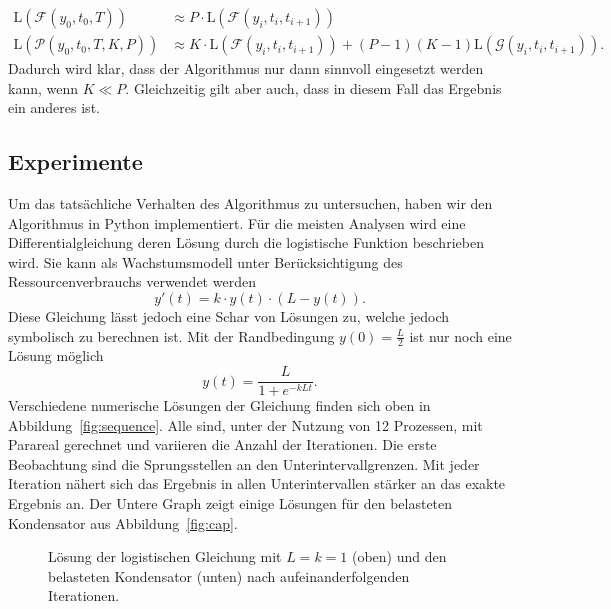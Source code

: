 \begin{align*}
    \mathrm{L}\!\left(\mathcal{F}\!\!\left(y_0, t_0, T\right)\right)
    &\approx P \cdot \mathrm{L}\!\left(\mathcal{F}\!\!\left(y_i, t_i, t_{i+1}\right)\right)\\
    \mathrm{L}\!\left(\mathcal{P}\!\!\left(y_0, t_0, T, K, P\right)\right)
    &\approx K \cdot \mathrm{L}\!\left(\mathcal{F}\!\!\left(y_i, t_i, t_{i+1}\right)\right) + (P-1) (K-1) \mathrm{L}\!\left(\mathcal{G}\!\!\left(y_i, t_i, t_{i+1}\right)\right).
\end{align*}
Dadurch wird klar, dass der Algorithmus nur dann sinnvoll eingesetzt werden kann, wenn \(K \ll P\). Gleichzeitig gilt aber auch, dass in diesem Fall das Ergebnis ein anderes ist.
\subsection*{Experimente}
Um das tatsächliche Verhalten des Algorithmus zu untersuchen, haben wir den Algorithmus in Python implementiert. Für die meisten Analysen wird eine Differentialgleichung deren Lösung durch die logistische Funktion beschrieben wird. Sie kann als Wachstumsmodell unter Berücksichtigung des Ressourcenverbrauchs verwendet werden
\begin{displaymath}
    y'(t) = k \cdot y(t) \cdot (L - y(t)).
\end{displaymath}
Diese Gleichung lässt jedoch eine Schar von Lösungen zu, welche jedoch symbolisch zu berechnen ist. Mit der Randbedingung \(y(0)= \frac{L}{2}\) ist nur noch eine Lösung möglich
\begin{displaymath}
    y(t) = \frac{L}{1+e^{-k L t}}.
\end{displaymath}
Verschiedene numerische Lösungen der Gleichung finden sich oben in Abbildung~\ref{fig:sequence}. Alle sind, unter der Nutzung von 12 Prozessen, mit Parareal gerechnet und variieren die Anzahl der Iterationen. Die erste Beobachtung sind die Sprungsstellen an den Unterintervallgrenzen. Mit jeder Iteration nähert sich das Ergebnis in allen Unterintervallen stärker an das exakte Ergebnis an. Der Untere Graph zeigt einige Lösungen für den belasteten Kondensator aus Abbildung~\ref{fig:cap}.
\begin{figure}[ht]
    \centering
        
        
    \caption{Lösung der logistischen Gleichung mit \(L = k = 1\) (oben) und den belasteten Kondensator (unten) nach aufeinanderfolgenden Iterationen.}
    \label{fig:iters_log}
\end{figure}


